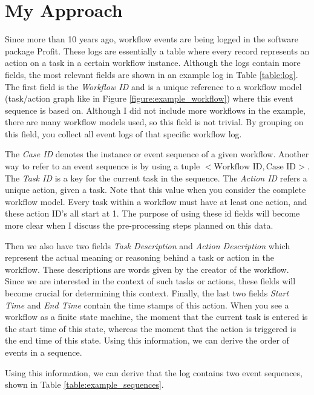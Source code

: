 \documentclass[a4paper,11pt]{article}
\begin{document}
\section{My Approach}
Since more than 10 years ago, workflow events are being logged in the software package Profit. These logs are essentially a table where every record represents an action on a task in a certain workflow instance. Although the logs contain more fields, the most relevant fields are shown in an example log in Table \ref{table:log}. The first field is the \textit{Workflow ID} and is a unique reference to a workflow model (task/action graph like in Figure \ref{figure:example_workflow}) where this event sequence is based on. Although I did not include more workflows in the example, there are many workflow models used, so this field is not trivial. By grouping on this field, you collect all event logs of that specific workflow log.

The \textit{Case ID} denotes the instance or event sequence of a given workflow. Another way to refer to an event sequence is by using a tuple $<\text{Workflow ID}, \text{Case ID}>$. The \textit{Task ID} is a key for the current task in the sequence. The \textit{Action ID} refers a unique action, given a task. Note that this value when you consider the complete workflow model. Every task within a workflow must have at least one action, and these action ID's all start at 1. The purpose of using these id fields will become more clear when I discuss the pre-processing steps planned on this data.

Then we also have two fields \textit{Task Description} and \textit{Action Description} which represent the actual meaning or reasoning behind a task or action in the workflow. These descriptions are words given by the creator of the workflow. Since we are interested in the context of such tasks or actions, these fields will become crucial for determining this context.
Finally, the last two fields \textit{Start Time} and \textit{End Time} contain the time stamps of this action. When you see a workflow as a finite state machine, the moment that the current task is entered is the start time of this state, whereas the moment that the action is triggered is the end time of this state. Using this information, we can derive the order of events in a sequence.

Using this information, we can derive that the log contains two event sequences, shown in Table \ref{table:example_sequences}. 
\end{document}
